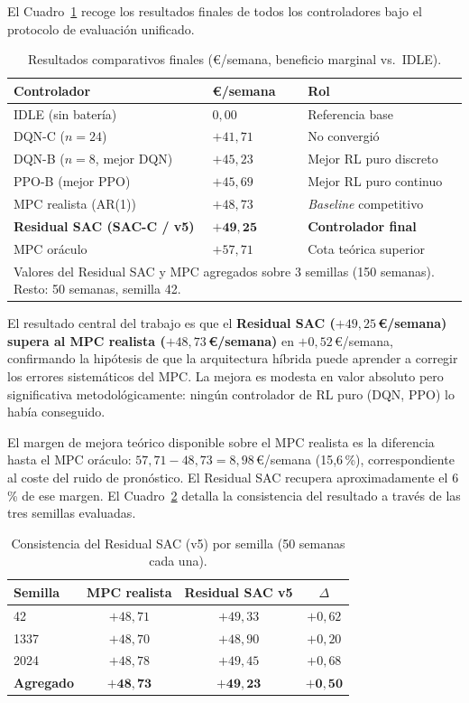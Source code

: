 \documentclass[12pt, a4paper, twoside]{report}
\begin{document}
El Cuadro~\ref{tab:resultados} recoge los resultados finales de todos los
controladores bajo el protocolo de evaluación unificado.

\begin{table}[H]
\centering
\caption{Resultados comparativos finales (€/semana, beneficio marginal vs.\ IDLE).}
\label{tab:resultados}
\begin{tabularx}{\textwidth}{llX}
\toprule
\textbf{Controlador} & \textbf{€/semana} & \textbf{Rol} \\
\midrule
IDLE (sin batería) & $0{,}00$ & Referencia base \\
DQN-C ($n{=}24$) & $+41{,}71$ & No convergió \\
DQN-B ($n{=}8$, mejor DQN) & $+45{,}23$ & Mejor RL puro discreto \\
PPO-B (mejor PPO) & $+45{,}69$ & Mejor RL puro continuo \\
MPC realista (AR(1)) & $+48{,}73$ & \textit{Baseline} competitivo \\
\textbf{Residual SAC (SAC-C / v5)} & $\mathbf{+49{,}25}$ & \textbf{Controlador final} \\
MPC oráculo & $+57{,}71$ & Cota teórica superior \\
\bottomrule
\multicolumn{3}{l}{\small Valores del Residual SAC y MPC agregados sobre 3
  semillas (150 semanas). Resto: 50 semanas, semilla 42.}
\end{tabularx}
\end{table}

El resultado central del trabajo es que el \textbf{Residual SAC
($+49{,}25$\,€/semana) supera al MPC realista ($+48{,}73$\,€/semana)} en
$+0{,}52$\,€/semana, confirmando la hipótesis de que la arquitectura híbrida
puede aprender a corregir los errores sistemáticos del MPC. La mejora es
modesta en valor absoluto pero significativa metodológicamente: ningún
controlador de RL puro (DQN, PPO) lo había conseguido.

El margen de mejora teórico disponible sobre el MPC realista es la diferencia
hasta el MPC oráculo: $57{,}71 - 48{,}73 = 8{,}98$\,€/semana (15{,}6\,\%),
correspondiente al coste del ruido de pronóstico. El Residual SAC recupera
aproximadamente el 6\,\% de ese margen. El Cuadro~\ref{tab:seeds} detalla la
consistencia del resultado a través de las tres semillas evaluadas.

\begin{table}[H]
\centering
\caption{Consistencia del Residual SAC (v5) por semilla (50 semanas cada una).}
\label{tab:seeds}
\begin{tabular}{lccc}
\toprule
\textbf{Semilla} & \textbf{MPC realista} & \textbf{Residual SAC v5} &
\textbf{$\Delta$} \\
\midrule
42 & $+48{,}71$ & $+49{,}33$ & $+0{,}62$ \\
1337 & $+48{,}70$ & $+48{,}90$ & $+0{,}20$ \\
2024 & $+48{,}78$ & $+49{,}45$ & $+0{,}68$ \\
\midrule
\textbf{Agregado} & $\mathbf{+48{,}73}$ & $\mathbf{+49{,}23}$ &
$\mathbf{+0{,}50}$ \\
\bottomrule
\end{tabular}
\end{table}
\end{document}
